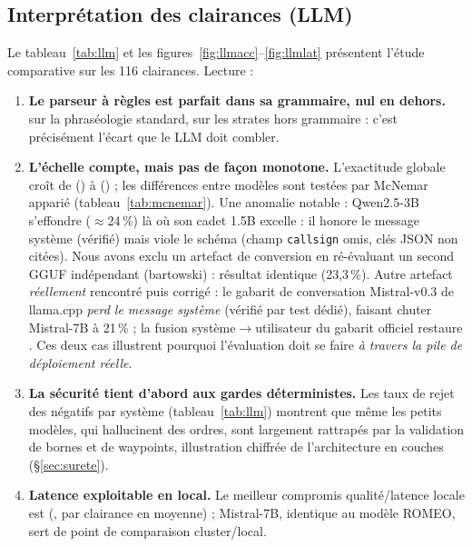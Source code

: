 \documentclass[10pt,a4paper]{article}
\newcommand{\syst}[1]{\texttt{#1}}
\begin{document}
\subsection{Interprétation des clairances (LLM)}
\label{sec:res-llm}

Le tableau~\ref{tab:llm} et les figures~\ref{fig:llmacc}--\ref{fig:llmlat}
présentent l'étude comparative sur les 116 clairances. Lecture :

\begin{enumerate}
\item \textbf{Le parseur à règles est parfait dans sa grammaire, nul en
      dehors.} \nParserInGrammar{} sur la phraséologie standard,
      \nParserHorsGram{} sur les strates hors grammaire : c'est précisément
      l'écart que le LLM doit combler.
\item \textbf{L'échelle compte, mais pas de façon monotone.} L'exactitude
      globale croît de \nLLMWorstAcc{} (\nLLMWorstName) à \nLLMBestAcc{}
      (\nLLMBestName) ; les différences entre modèles sont testées par
      McNemar apparié (tableau~\ref{tab:mcnemar}). Une anomalie notable :
      Qwen2.5-3B s'effondre ($\approx$24\,\%) là où son cadet 1.5B excelle : il honore le message système (vérifié) mais viole le schéma
      (champ \syst{callsign} omis, clés JSON non citées). Nous avons exclu
      un artefact de conversion en ré-évaluant un second GGUF indépendant
      (bartowski) : résultat identique (23,3\,\%). Autre artefact
      \emph{réellement} rencontré puis corrigé : le gabarit de conversation
      Mistral-v0.3 de llama.cpp \emph{perd le message système} (vérifié par
      test dédié), faisant chuter Mistral-7B à 21\,\% ; la fusion
      système$\rightarrow$utilisateur du gabarit officiel restaure
      \nLLMBestAcc{}. Ces deux cas illustrent pourquoi l'évaluation doit se
      faire \emph{à travers la pile de déploiement réelle}.
\item \textbf{La sécurité tient d'abord aux gardes déterministes.} Les taux
      de rejet des négatifs par système (tableau~\ref{tab:llm}) montrent que
      même les petits modèles, qui hallucinent des ordres, sont largement
      rattrapés par la validation de bornes et de waypoints, illustration chiffrée de l'architecture en couches (\S\ref{sec:surete}).
\item \textbf{Latence exploitable en local.} Le meilleur compromis
      qualité/latence locale est \nLLMSweetName{} (\nLLMSweetAcc,
      \nLLMSweetLat{} par clairance en moyenne) ; Mistral-7B, identique au
      modèle ROMEO, sert de point de comparaison cluster/local.
\end{enumerate}
\end{document}
